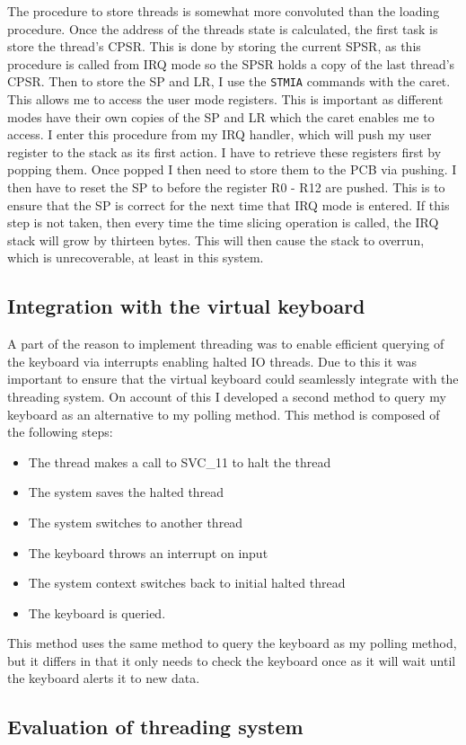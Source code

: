 The procedure to store threads is somewhat more convoluted than the loading procedure. Once the address of the threads state is calculated, the first task is store the thread's CPSR. This is done by storing the current SPSR, as this procedure is called from IRQ mode so the SPSR holds a copy of the last thread's CPSR. Then to store the SP and LR, I use the \verb|STMIA| commands with the caret. This allows me to access the user mode registers. This is important as different modes have their own copies of the SP and LR which the caret enables me to access. I enter this procedure from my IRQ handler, which will push my user register to the stack as its first action. I have to retrieve these registers first by popping them. Once popped I then need to store them to the PCB via pushing. I then have to reset the SP to before the register R0 - R12 are pushed. This is  to ensure that the SP is correct for the next time that IRQ mode is entered. If this step is not taken, then every time the time slicing operation is called, the IRQ stack will grow by thirteen bytes. This will then cause the stack to overrun, which is unrecoverable, at least in this system.


\subsection{Integration with the virtual keyboard}
A part of the reason to implement threading was to enable efficient querying of the keyboard via interrupts enabling halted IO threads. Due to this it was important to ensure that the virtual keyboard could seamlessly integrate with the threading system. On account of this I developed a second method to query my keyboard as an alternative to my polling method. This method is composed of the following steps:

\begin{itemize}
	\item The thread makes a call to SVC\_11 to halt the thread
	\item The system saves the halted thread
	\item The system switches to another thread
	\item The keyboard throws an interrupt on input
	\item The system context switches back to initial halted thread
	\item The keyboard is queried.
\end{itemize}
This method uses the same method to query the keyboard as my polling method, but it differs in that it only needs to check the keyboard once as it will wait until the keyboard alerts it to new data. 



\subsection{Evaluation of threading system}
\label{threadingeval}

















